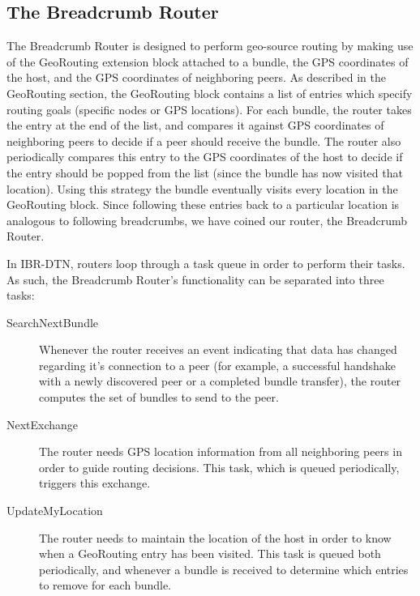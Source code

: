 \subsection{The Breadcrumb Router}

The {\sc Breadcrumb} Router is designed to perform geo-source routing by making use of the {\sc GeoRouting} extension block attached to a bundle, the GPS coordinates of the host, and the GPS coordinates of neighboring peers. As described in the {\sc GeoRouting} section, the {\sc GeoRouting} block contains a list of entries which specify routing goals (specific nodes or GPS locations). For each bundle, the router takes the entry at the end of the list, and compares it against GPS coordinates of neighboring peers to decide if a peer should receive the bundle. The router also periodically compares this entry to the GPS coordinates of the host to decide if the entry should be popped from the list (since the bundle has now visited that location). Using this strategy the bundle eventually visits every location in the GeoRouting block. Since following these entries back to a particular location is analogous to following breadcrumbs, we have coined our router, the Breadcrumb Router.

In IBR-DTN, routers loop through a task queue in order to perform their tasks. As such, the {\sc Breadcrumb} Router's functionality can be separated into three tasks:

\begin{description}
\item[SearchNextBundle] Whenever the router receives an event indicating that data has changed regarding it's connection to a peer (for example, a successful handshake with a newly discovered peer or a completed bundle transfer), the router computes the set of bundles to send to the peer.
\item[NextExchange] The router needs GPS location information from all neighboring peers in order to guide routing decisions. This task, which is queued periodically, triggers this exchange.
\item[UpdateMyLocation] The router needs to maintain the location of the host in order to know when a {\sc GeoRouting} entry has been visited. This task is queued both periodically, and whenever a bundle is received to determine which entries to remove for each bundle.
\end{description}

